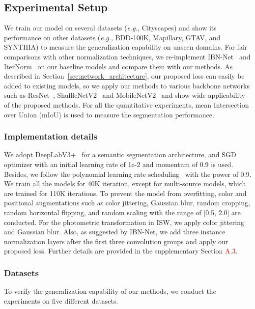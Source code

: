 \documentclass[final]{latex/cvpr}
\newcommand{\todow}[1]{\textcolor{red}{#1}}
\begin{document}
\subsection{Experimental Setup}
\vspace{-0.08cm}
We train our model on several datasets (\textit{e.g.,} Cityscapes) and show its performance on other datasets (\textit{e.g.,} BDD-100K, Mapillary, GTAV, and SYNTHIA) to measure the generalization capability on unseen domains.
For fair comparisons with other normalization techniques, we re-implement IBN-Net~\cite{pan2018two} and IterNorm~\cite{huang2019iterative} on our baseline models and compare them with our methods.
As described in Section~\ref{sec:network_architecture}, our proposed loss can easily be added to existing models, so we apply our methods to various backbone networks such as 
ResNet~\cite{he2016deep}, ShuffleNetV2~\cite{ma2018shufflenet} and MobileNetV2~\cite{sandler2018mobilenetv2} and show wide applicability of the proposed methods.
For all the quantitative experiments, mean Intersection over Union (mIoU) is used to measure the segmentation performance.
\vspace{-0.4cm}
\subsubsection{Implementation details}
\vspace{-0.1cm}
We adopt DeepLabV3+~\cite{chen2018encoder} for a semantic segmentation architecture, and SGD optimizer with an initial learning rate of 1e-2 and momentum of 0.9 is used. Besides, we follow the polynomial learning rate scheduling~\cite{liu2015parsenet} with the power of 0.9. We train all the models for 40K iteration, except for multi-source models, which are trained for 110K iterations. To prevent the model from overfitting, color and positional augmentations such as color jittering, Gaussian blur, random cropping, random horizontal flipping, and random scaling with the range of [0.5, 2.0] are conducted. For the photometric transformation in ISW, we apply color jittering and Gaussian blur.
Also, as suggested by IBN-Net, we add three instance normalization layers after the first three convolution groups and apply our proposed loss.
Further details are provided in the supplementary Section \todow{A.3}.
\vspace{-0.35cm}
\subsubsection{Datasets}
\vspace{-0.2cm}
To verify the generalization capability of our methods, we conduct the experiments on five different datasets.
\vspace{-0.48cm}
\end{document}

